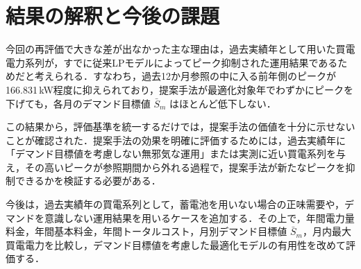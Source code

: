 \documentclass[a4paper,11pt,dvipdfmx]{jsarticle}
\begin{document}
\section{結果の解釈と今後の課題}
今回の再評価で大きな差が出なかった主な理由は，過去実績年として用いた買電電力系列が，すでに従来LPモデルによってピーク抑制された運用結果であるためだと考えられる．すなわち，過去12か月参照の中に入る前年側のピークが166.831\,kW程度に抑えられており，提案手法が最適化対象年でわずかにピークを下げても，各月のデマンド目標値 $\bar{S}_{m}$ はほとんど低下しない．

この結果から，評価基準を統一するだけでは，提案手法の価値を十分に示せないことが確認された．提案手法の効果を明確に評価するためには，過去実績年に「デマンド目標値を考慮しない無邪気な運用」または実測に近い買電系列を与え，その高いピークが参照期間から外れる過程で，提案手法が新たなピークを抑制できるかを検証する必要がある．

今後は，過去実績年の買電系列として，蓄電池を用いない場合の正味需要や，デマンドを意識しない運用結果を用いるケースを追加する．その上で，年間電力量料金，年間基本料金，年間トータルコスト，月別デマンド目標値 $\bar{S}_{m}$，月内最大買電電力を比較し，デマンド目標値を考慮した最適化モデルの有用性を改めて評価する．
\end{document}
